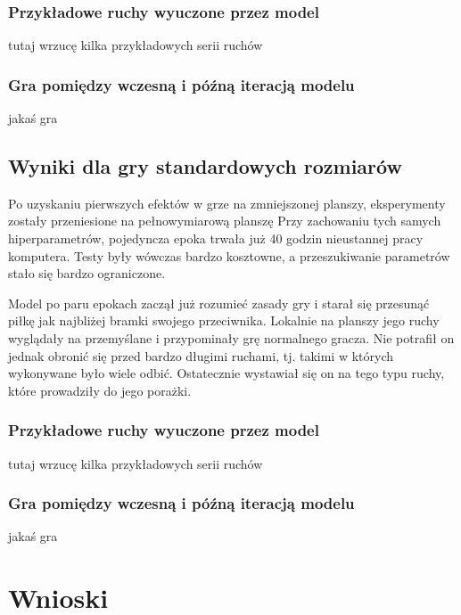 \documentclass[licencjacka]{pracamgr}
\begin{document}
\subsection{Przykładowe ruchy wyuczone przez model}

tutaj wrzucę kilka przykładowych serii ruchów

\subsection{Gra pomiędzy wczesną i późną iteracją modelu}

jakaś gra

\section{Wyniki dla gry standardowych rozmiarów}

Po uzyskaniu pierwszych efektów w grze na zmniejszonej planszy, eksperymenty zostały przeniesione na pełnowymiarową planszę Przy zachowaniu tych samych hiperparametrów, pojedyncza epoka trwała już 40 godzin nieustannej pracy komputera. Testy były wówczas bardzo kosztowne, a przeszukiwanie parametrów stało się bardzo ograniczone. 

Model po paru epokach zaczął już rozumieć zasady gry i starał się przesunąć piłkę jak najbliżej bramki swojego przeciwnika. Lokalnie na planszy jego ruchy wyglądały na przemyślane i przypominały grę normalnego gracza. Nie potrafił on jednak obronić się przed bardzo długimi ruchami, tj. takimi w których wykonywane było wiele odbić. Ostatecznie wystawiał się on na tego typu ruchy, które prowadziły do jego porażki.


\subsection{Przykładowe ruchy wyuczone przez model}

tutaj wrzucę kilka przykładowych serii ruchów


\subsection{Gra pomiędzy wczesną i późną iteracją modelu}

jakaś gra

\chapter{Wnioski}
\end{document}
